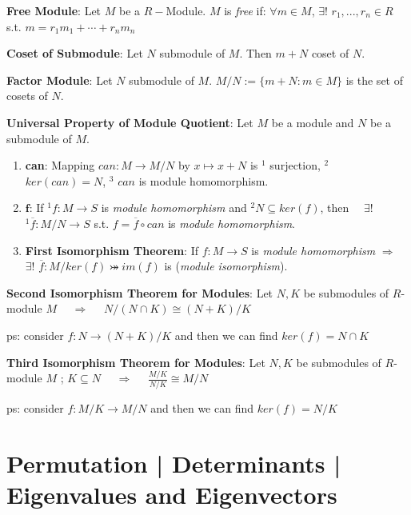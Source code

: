 \documentclass[9pt]{article}
\begin{document}
\textbf{Free Module}: Let $M$ be a $R-$Module. $M$ is \textit{free} if: $\forall m\in M$, $\exists!$ $r_1,...,r_n\in R$ s.t. $m=r_1m_1+\cdots+r_nm_n$ 

\textbf{Coset of Submodule}: Let $N$ submodule of $M$. Then $m+N$ coset of $N$. 

\textbf{Factor Module}: Let $N$ submodule of $M$. $M/N:=\{m+N:m\in M\}$ is the set of cosets of $N$.


\textbf{Universal Property of Module Quotient}: Let $M$ be a module and $N$ be a submodule of $M$. 
\begin{enumerate}[itemsep=-2pt, topsep=-2pt]
    \item \textbf{can}: Mapping $can:M\to M/N$ by $x\mapsto x+N$ is $^1$ surjection, $^2$ $ker(can)=N$, $^3$ $can$ is module homomorphism.
    \item \textbf{$\textbf{f}$}: If $^1f:M\to S$ is \textit{module homomorphism} and $^2N\subseteq ker(f)$, then \ \ $\exists!$ $^1\overline{f}:M/N\to S$ s.t. $f=\overline{f}\circ can$ is \textit{module homomorphism}.
    \item \textbf{First Isomorphism Theorem}: If $f:M\to S$ is \textit{module homomorphism} $\Rightarrow$ $\exists!$ $\overline{f}:M/ker(f)\bij im(f)$ is  (\textit{module isomorphism}).
\end{enumerate}

\vspace{2pt}
\np\textbf{Second Isomorphism Theorem for Modules}: Let $N,K$ be submodules of $R$-module $M$ \ \ $\Rightarrow$ \ \ $N/(N\cap K)\cong (N+K)/K$

\quad ps: {\footnotesize consider $f:N\to (N+K)/K$ and then we can find $ker(f)=N\cap K$}

\vspace{2pt}
\np\textbf{Third Isomorphism Theorem for Modules}: Let $N,K$ be submodules of $R$-module $M$ ; $K\subseteq N$ \ \ $\Rightarrow$ \ \ $\frac{M/K}{N/K}\cong M/N$

\quad ps: {\footnotesize consider $f:M/K\to M/N$ and then we can find $ker(f)=N/K$}


\section{Permutation | Determinants | Eigenvalues and Eigenvectors} %
\end{document}
